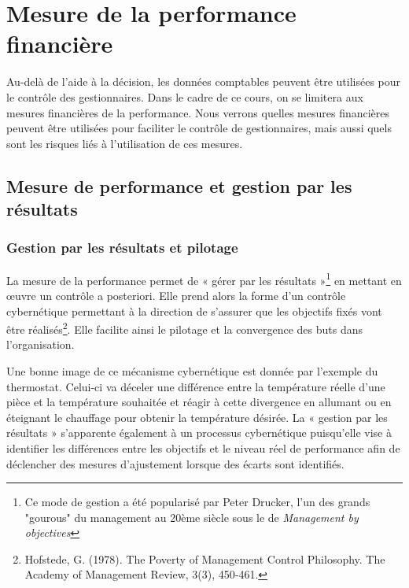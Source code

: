 \documentclass[oneside]{kaobook}
\begin{document}
\chapter{Mesure de la performance financière}
\label{sec:orga4d7e9a}
Au-delà de l'aide à la décision, les données comptables peuvent être utilisées pour le contrôle des gestionnaires. Dans le cadre de ce cours, on se limitera aux mesures financières de la performance. Nous verrons quelles mesures financières peuvent être utilisées pour faciliter le contrôle de gestionnaires, mais aussi quels sont les risques liés à l'utilisation de ces mesures.
\section{Mesure de performance et gestion par les résultats}
\label{sec:org6266872}
\subsection{Gestion par les résultats et pilotage}
\label{sec:org1a59cce}
La mesure de la performance permet de « gérer par les résultats »\footnote{Ce mode de gestion a été popularisé par Peter Drucker, l'un des grands "gourous" du management au 20ème siècle sous le de \emph{Management by objectives}} en mettant en œuvre un contrôle a posteriori. Elle prend alors la forme d’un contrôle cybernétique permettant à la direction de s’assurer que les objectifs fixés vont être réalisés\footnote{Hofstede, G. (1978). The Poverty of Management Control Philosophy. The Academy of Management Review, 3(3), 450‑461.}. Elle facilite ainsi le pilotage et la convergence des buts dans l’organisation.

Une bonne image de ce mécanisme cybernétique est donnée par l’exemple du thermostat. Celui-ci va déceler une différence entre la température réelle d’une pièce et la température souhaitée et réagir à cette divergence en allumant ou en éteignant le chauffage pour obtenir la température désirée. La « gestion par les résultats » s’apparente également à un processus cybernétique puisqu’elle vise à identifier les différences entre les objectifs et le niveau réel de performance afin de déclencher des mesures d’ajustement lorsque des écarts sont identifiés.
\end{document}

